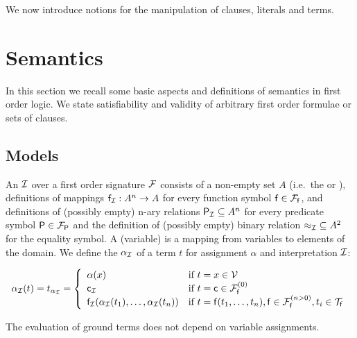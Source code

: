We now introduce notions for the manipulation
of clauses, literals and terms.









\section{Semantics}\label{sec:semantics}

In this section we recall some basic aspects and definitions of semantics in first order logic.
We state satisfiability and validity of arbitrary first order formulae or sets of clauses.

\subsection{Models}

\begin{definition}\label{def:interpretation}
	An  \( \mcI \)
	over a first order signature \( \mcF \) consists of a
	non-empty set \( A \)
	(i.e.\ the  or ),
%
	definitions of mappings
	\( \mf_\mcI: A^n\rightarrow A \)
	for every function symbol \( \mf\in\mcFf \),
	and definitions of (possibly empty) n-ary relations
	 \( {\mP_\mcI}\subseteq A^n \) for every predicate symbol \( \mP\in\mcFP \)
	 and the definition of (possibly empty) binary relation \( {\mEQ_\mcI}\subseteq A^2 \) for the equality symbol.
%
	 A (variable)  is a mapping from variables to elements of the domain.
%
	 We define the  \( \alpha_\mcI \) of a term \( t \)
	 for assignment \( \alpha \) and interpretation \( \mcI \):

	 \begin{gather*}
	 \MDEFINE{\alpha_\mcI(t) = t_{\alpha_\mcI}}{ll}{
	 	\alpha(x)
	 	&\text{if }t=x\in\mcV \\
	 	\mc_\mcI
	 	&\text{if }t=\mc\in\mcFfn[0]
	 	\\
	 	\mf_\mcI (\alpha_\mcI(t_1),\ldots,\alpha_\mcI(t_n))
	 	&\text{if }t=\mf(t_1,\ldots,t_n), \mf\in\mcFfn[n>0], t_i\in\mcTf
 }
	 \end{gather*}

\end{definition}
\begin{remark}
	The evaluation of ground terms does not depend on variable assignments.
\end{remark}

